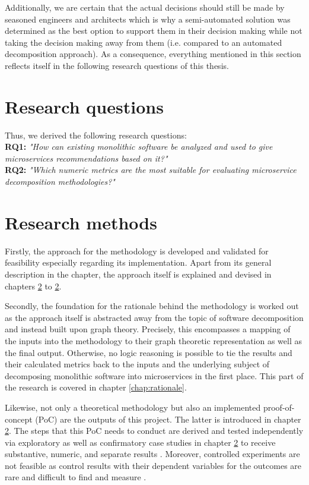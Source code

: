 \documentclass[12pt,a4paper]{report}
\begin{document}
Additionally, we are certain that the actual decisions should still be made
by seasoned engineers and architects which is why a semi-automated solution
was determined as the best option to support them in their
decision making while not taking the decision making away from them
(i.e. compared to an automated decomposition approach).
As a consequence, everything mentioned in this section reflects itself in
the following research questions of this thesis.



\section{Research questions}

\hangindent=1cm
\noindent Thus, we derived the following research questions:\\
\textbf{RQ1:} \textit{"How can existing monolithic software be analyzed
and used to give microservices recommendations based on it?"}\\
\textbf{RQ2:} \textit{"Which numeric metrics are the most suitable
for evaluating microservice decomposition methodologies?"}



\section{Research methods} %

Firstly, the approach for the methodology is developed and validated
for feasibility especially regarding its implementation.
Apart from its general description in the \textit{} chapter,
the approach itself is explained and devised in chapters \ref{} to \ref{}.

Secondly, the foundation for the rationale behind the methodology is worked out
as the approach itself is abstracted away from the topic of
software decomposition and instead built upon graph theory.
Precisely, this encompasses a mapping of the inputs into the methodology to
their graph theoretic representation as well as the final output.
Otherwise, no logic reasoning is possible to tie the results and
their calculated metrics back to the inputs and the underlying subject
of decomposing monolithic software into microservices in the first place.
This part of the research is covered in chapter \ref{chap:rationale}.

Likewise, not only a theoretical methodology but also an implemented
proof-of-concept (PoC) are the outputs of this project.
The latter is introduced in chapter \ref{}.
The steps that this PoC needs to conduct are derived and tested
independently via exploratory as well as confirmatory case studies
in chapter \ref{} to receive substantive, numeric,
and separate results \cite{easterbrook2008selecting}.
Moreover, controlled experiments are not feasible as control results
with their dependent variables for the outcomes are rare and difficult
to find and measure \cite{easterbrook2008selecting}.
\end{document}
